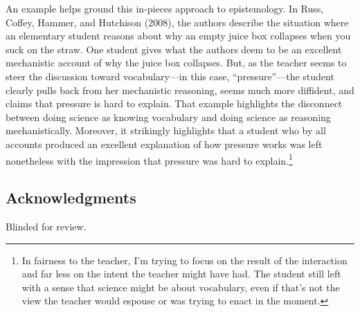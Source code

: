 An example helps ground this in-pieces approach to epistemology. In
Russ, Coffey, Hammer, and Hutchison (2008), the authors describe the
situation where an elementary student reasons about why an empty juice
box collapses when you suck on the straw. One student gives what the
authors deem to be an excellent mechanistic account of why the juice box
collapses. But, as the teacher seems to steer the discussion toward
vocabulary---in this case, ``pressure''---the student clearly pulls back
from her mechanistic reasoning, seems much more diffident, and claims
that pressure is hard to explain. That example highlights the disconnect
between doing science as knowing vocabulary and doing science as
reasoning mechanistically. Moreover, it strikingly highlights that a
student who by all accounts produced an excellent explanation of how
pressure works was left nonetheless with the impression that pressure
was hard to explain.\footnote{In fairness to the teacher, I'm trying to
  focus on the result of the interaction and far less on the intent the
  teacher might have had. The student still left with a sense that
  science might be about vocabulary, even if that's not the view the
  teacher would espouse or was trying to enact in the moment.}

\subsection{Acknowledgments}\label{acknowledgments}

Blinded for review.

\clearpage



